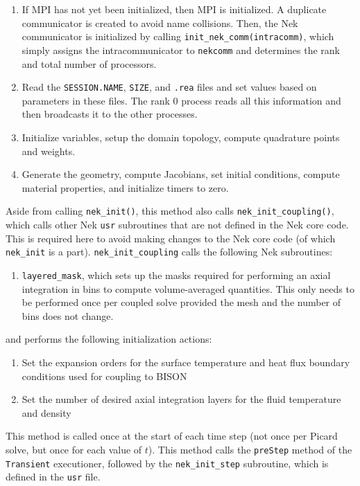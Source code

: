 \documentclass[10pt]{article}
\newcounter{subsubsubsection}[subsubsection]
\numberwithin{equation}{section} %
\begin{document}
\begin{enumerate}
\item If MPI has not yet been initialized, then MPI is initialized. A duplicate communicator is created to avoid name collisions. Then, the Nek communicator is initialized by calling {\tt init\_nek\_comm(intracomm)}, which simply assigns the intracommunicator to {\tt nekcomm} and determines the rank and total number of processors.
\item Read the {\tt SESSION.NAME}, {\tt SIZE}, and {\tt .rea} files and set values based on parameters in these files. The rank 0 process reads all this information and then broadcasts it to the other processes.
\item Initialize variables, setup the domain topology, compute quadrature points and weights.
\item Generate the geometry, compute Jacobians, set initial conditions, compute material properties, and initialize timers to zero.
\end{enumerate}

Aside from calling {\tt nek\_init()}, this method also calls {\tt nek\_init\_coupling()}, which calls other Nek {\tt usr} subroutines that are not defined in the Nek core code. This is required here to avoid making changes to the Nek core code (of which {\tt nek\_init} is a part). {\tt nek\_init\_coupling} calls the following Nek subroutines:

\begin{enumerate}
\item {\tt layered\_mask}, which sets up the masks required for performing an axial integration in bins to compute volume-averaged quantities. This only needs to be performed once per coupled solve provided the mesh and the number of bins does not change.
\end{enumerate}

and performs the following initialization actions:

\begin{enumerate}
\item Set the expansion orders for the surface temperature and heat flux boundary conditions used for coupling to BISON
\item Set the number of desired axial integration layers for the fluid temperature and density
\end{enumerate}

This method is called once at the start of each time step (not once per Picard solve, but once for each value of \(t\)). This method calls the {\tt preStep} method of the {\tt Transient} executioner, followed by the {\tt nek\_init\_step} subroutine, which is defined in the {\tt usr} file.
\end{document}
